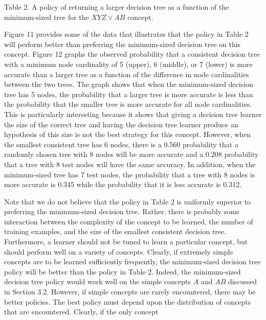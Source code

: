 \vspace{0.4cm}
\parindent 0.0cm
Table 2. A policy of returning a larger decision tree as a function
of the minimum-sized tree for the $XYZ \vee AB$ concept.\\
\parindent 0.6cm

Figure 11 provides some of the data that illustrates that the policy
in Table 2 will perform better than preferring the minimum-sized
decision tree on this concept.  Figure 12 graphs the observed
probability that a consistent decision tree with a minimum node
cardinality of 5 (upper), 6 (middle), or 7 (lower) is more accurate
than a larger tree as a function of the difference in node
cardinalities between the two trees.  The graph shows that when the
minimum-sized decision tree has 5 nodes, the probability that a larger
tree is more accurate is less than the probability that the smaller
tree is more accurate for all node cardinalities.  This is particularly
interesting because it shows that giving a decision tree learner
the size of the correct tree and having the decision tree learner
produce an hypothesis of this size is not the best strategy for this
concept.  However, when the smallest consistent tree has 6 nodes, there 
is a 0.560 probability that
a randomly chosen tree with 8 nodes will be more accurate and a 0.208
probability that a tree with 8 test nodes will have the same
accuracy.  In addition, when the minimum-sized tree has 7 test nodes,
the probability that a tree with 8 nodes is more accurate is 0.345 while
the probability that it is less accurate is 0.312.  

Note that we do not believe that the policy in Table 2 is uniformly
superior to preferring the minimum-sized decision tree. Rather, there
is probably some interaction between the complexity of the
concept to be learned, the number of training examples, and the size of
the smallest consistent decision tree.  Furthermore, a learner should
not be tuned to learn a particular concept, but should perform well on
a variety of concepts.  Clearly, if extremely simple concepts are to
be learned sufficiently frequently, the minimum-sized decision tree
policy will be better than the policy in Table 2.  Indeed, the
minimum-sized decision tree policy would work well on the simple
concepts $A$ and $AB$ discussed in Section 3.2.  However, if simple
concepts are rarely encountered, there may be better policies.  The
best policy must depend upon the distribution of concepts that are
encountered. Clearly, if the only concept

\vspace*{0.3cm}
\hspace{1.2cm}
\centerline{}
\vspace{0.1cm}
\hspace{1.8cm}
\centerline{}
\vspace{0.1cm}
\hspace{1.8cm}
\centerline{}

